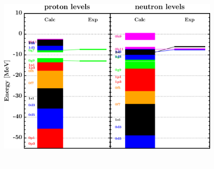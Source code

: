 \documentclass[twocolumn,secnumarabic,amssymb, nobibnotes, aps, prl,
superscriptaddress, nobalancelastpage]{revtex4}
\begin{document}
\begin{figure}[!htb]
\begin{minipage}{0.4\linewidth}
        \label{DOM_sn124_chargeDensity}
    \end{minipage}
    \begin{minipage}{0.35\linewidth}
        \centering
        \includegraphics[width=\linewidth]{figures/sn124_SPLevels.png}
        \label{DOM_sn124_SPLevels}
    \end{minipage}
    \begin{minipage}{0.4\linewidth}
        \centering
        \includegraphics[width=\linewidth]{figures/sn124_RMSRadius.png}

\end{minipage}
\end{figure}
\end{document}
